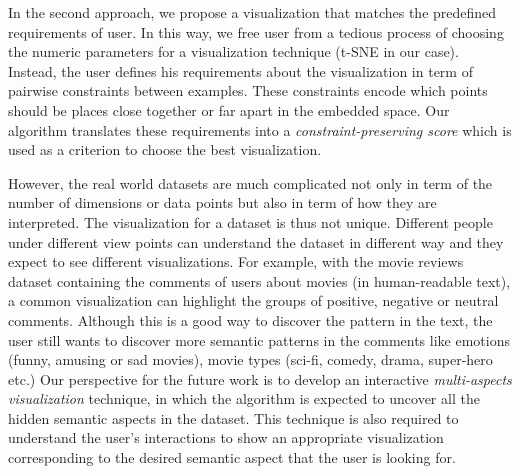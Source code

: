In the second approach, we propose a visualization that matches the predefined requirements of user.
In this way, we free user from a tedious process of choosing the numeric parameters for a visualization technique (t-SNE in our case).
Instead, the user defines his requirements about the visualization in term of pairwise constraints between examples.
These constraints encode which points should be places close together or far apart in the embedded space.
Our algorithm translates these requirements into a \emph{constraint-preserving score} which is used as a criterion to choose the best visualization.

However, the real world datasets are much complicated not only in term of the number of dimensions or data points but also in term of how they are interpreted.
The visualization for a dataset is thus not unique. Different people under different view points can understand the dataset in different way and they expect to see different visualizations.
For example, with the movie reviews dataset containing the comments of users about movies (in human-readable text), a common visualization can highlight the groups of positive, negative or neutral comments.
Although this is a good way to discover the pattern in the text, the user still wants to discover more semantic patterns in the comments like emotions (funny, amusing or sad movies), movie types (sci-fi, comedy, drama, super-hero etc.)
Our perspective for the future work is to develop an interactive \emph{multi-aspects visualization} technique, in which the algorithm is expected to uncover all the hidden semantic aspects in the dataset.
This technique is also required to understand the user's interactions to show an appropriate visualization corresponding to the desired semantic aspect that the user is looking for.